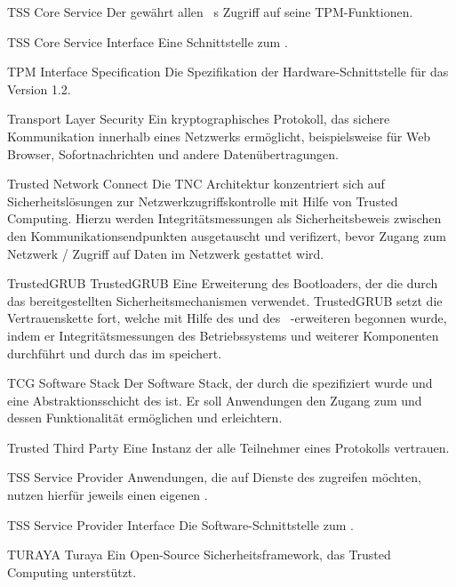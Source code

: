 	{TSS Core Service}
	{Der \TSSlong gewährt allen \TSP~s Zugriff auf seine TPM-Funktionen.}

	{TSS Core Service Interface}
	{Eine Schnittstelle zum \TCSlong.}

	{TPM Interface Specification}
	{Die Spezifikation der Hardware-Schnittstelle f\"ur das \TPM Version 1.2.}


        {Transport Layer Security}
        {Ein kryptographisches Protokoll, das sichere Kommunikation
         innerhalb eines Netzwerks erm\"oglicht, beispielsweise f\"ur Web
         Browser, Sofortnachrichten und andere Daten\"ubertragungen.}

	{Trusted Network Connect}
	{Die TNC Architektur konzentriert sich auf Sicherheitsl\"osungen zur Netzwerkzugriffskontrolle mit Hilfe von Trusted Computing. 
	Hierzu werden Integrit\"atsmessungen als Sicherheitsbeweis zwischen den Kommunikationsendpunkten ausgetauscht und verifizert, 
	bevor Zugang zum Netzwerk / Zugriff auf Daten im Netzwerk gestattet wird.}

\glosentry
	{TrustedGRUB}
	{TrustedGRUB}
	{Eine Erweiterung des \GRUB Bootloaders, der die durch das \TPM bereitgestellten 
	Sicherheitsmechanismen verwendet. TrustedGRUB setzt die Vertrauenskette fort, welche mit Hilfe
	des \CRTM und des \TCG~-erweiteren \BIOS begonnen wurde, indem er Integrit\"atsmessungen des Betriebssystems
	und weiterer Komponenten durchf\"uhrt und durch das \RTM im \TPM speichert.}

	{TCG Software Stack}
	{Der Software Stack, der durch die \TCG spezifiziert wurde und eine Abstraktionsschicht des \TPM ist.
	Er soll Anwendungen den Zugang zum \TPM und dessen Funktionalit\"at erm\"oglichen und erleichtern.}

	{Trusted Third Party}
	{Eine Instanz der alle Teilnehmer eines Protokolls vertrauen.}
	 

	{TSS Service Provider}
	{Anwendungen, die auf Dienste des \TSS zugreifen möchten, nutzen hierfür jeweils einen eigenen \TSP.}

	{TSS Service Provider Interface}
	{Die Software-Schnittstelle zum \TSP.}

\glosentry
	{TURAYA}
	{Turaya}
	{Ein Open-Source Sicherheitsframework, das Trusted Computing unterst\"utzt.}


